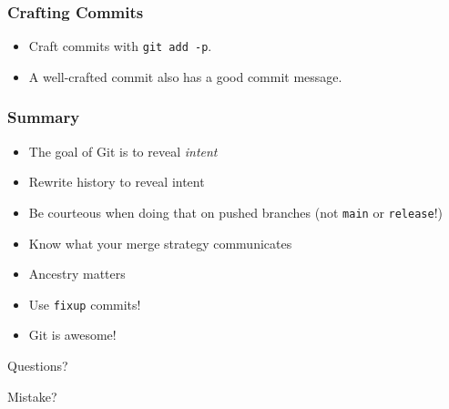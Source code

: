\documentclass{beamer}
\begin{document}
\begin{frame}
\begin{center}
  \end{center}
\end{frame}

\begin{frame}
  \frametitle{Crafting Commits}
  \pause
  \begin{itemize}[<+->]
  \item Craft commits with \texttt{git add -p}.
  \item A well-crafted commit also has a good commit message.
  \end{itemize}
\end{frame}

\begin{frame}
  \frametitle{Summary}
  \pause
  \begin{itemize}[<+->]
  \item The goal of Git is to reveal \textit{intent}
  \item Rewrite history to reveal intent
  \item Be courteous when doing that on pushed branches (not \texttt{main} or \texttt{release}!)
  \item Know what your merge strategy communicates
  \item Ancestry matters
  \item Use \texttt{fixup} commits!
  \item Git is awesome!
  \end{itemize}
\end{frame}
        
\begin{frame}
  \begin{center}
    {\Huge Questions?}
  \end{center}
\end{frame}

\begin{frame}
  \begin{center}
    {\Huge Mistake?}
  \end{center}
\end{frame}
\end{document}
